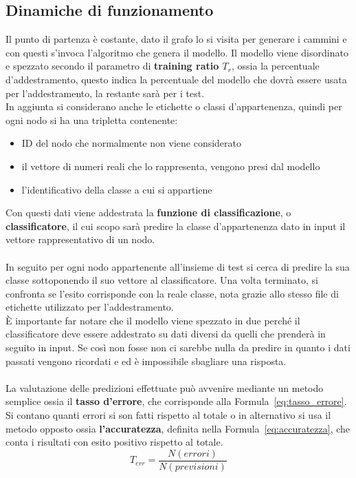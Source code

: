 \subsection{Dinamiche di funzionamento}
Il punto di partenza è costante, dato il grafo lo si visita per generare i cammini e con questi s'invoca l'algoritmo che genera il modello. Il modello viene disordinato e spezzato secondo il parametro di \textbf{training ratio $T_r$}, ossia la percentuale d'addestramento, questo indica la percentuale del modello che dovrà essere usata per l'addestramento, la restante sarà per i test.\\
In aggiunta si considerano anche le etichette o classi d'appartenenza, quindi per ogni nodo si ha una tripletta contenente:
\begin{itemize}
	\item ID del nodo che normalmente non viene considerato
	\item il vettore di numeri reali che lo rappresenta, vengono presi dal modello
	\item l'identificativo della classe a cui si appartiene
\end{itemize}
Con questi dati viene addestrata la \textbf{funzione di classificazione}, o \textbf{classificatore}, il cui scopo sarà predire la classe d'appartenenza dato in input il vettore rappresentativo di un nodo.\\
\\
In seguito per ogni nodo appartenente all'insieme di test si cerca di predire la sua classe sottoponendo il suo vettore al classificatore. Una volta terminato, si confronta se l'esito corrisponde con la reale classe, nota grazie allo stesso file di etichette utilizzato per l'addestramento.\\
È importante far notare che il modello viene spezzato in due perché il classificatore deve essere addestrato su dati diversi da quelli che prenderà in seguito in input. Se così non fosse non ci sarebbe nulla da predire in quanto i dati passati vengono ricordati e ed è impossibile sbagliare una risposta.\\
\\
La valutazione delle predizioni effettuate può avvenire mediante un metodo semplice ossia il \textbf{tasso d'errore}, che corrisponde alla Formula~\ref{eq:tasso_errore}. Si contano quanti errori si son fatti rispetto al totale o in alternativo si usa il metodo opposto ossia \textbf{l'accuratezza}, definita nella Formula~\ref{eq:accuratezza}, che conta i risultati con esito positivo rispetto al totale.
%
\begin{equation}
	T_{err} = \frac{N(errori)}{N(previsioni)}
	\label{eq:tasso_errore}
\end{equation}
